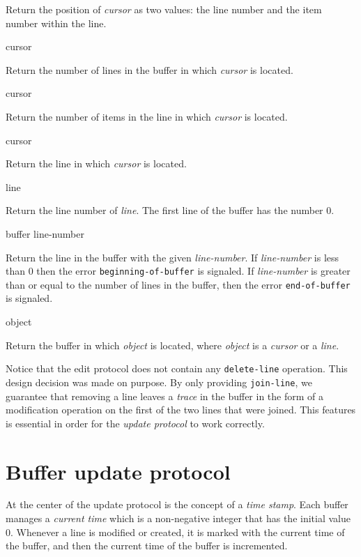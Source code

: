 Return the position of \textit{cursor} as two values: the line number
and the item number within the line. 

 {cursor}

Return the number of lines in the buffer in which \textit{cursor} is
located.

 {cursor}

Return the number of items in the line in which \textit{cursor} is
located.

 {cursor}

Return the line in which \textit{cursor} is located. 

 {line}

Return the line number of \textit{line}.  The first line of the buffer
has the number $0$. 

 {buffer line-number}

Return the line in the buffer with the given \textit{line-number}.  If
\textit{line-number} is less than $0$ then the error
\texttt{beginning-of-buffer} is signaled.  If \textit{line-number} is
greater than or equal to the number of lines in the buffer, then the
error \texttt{end-of-buffer} is signaled.

 {object}

Return the buffer in which \textit{object} is located, where
\textit{object} is a \emph{cursor} or a \emph{line}.

Notice that the edit protocol does not contain any
\texttt{delete-line} operation.  This design decision was made on
purpose.  By only providing \texttt{join-line}, we guarantee that
removing a line leaves a \emph{trace} in the buffer in the form of a
modification operation on the first of the two lines that were
joined.  This features is essential in order for the \emph{update
  protocol} to work correctly.

\section{Buffer update protocol}

At the center of the update protocol is the concept of a \emph{time
  stamp}.  Each buffer manages a \emph{current time} which is a
non-negative integer that has the initial value $0$.  Whenever a line
is modified or created, it is marked with the current time of the
buffer, and then the current time of the buffer is incremented.


